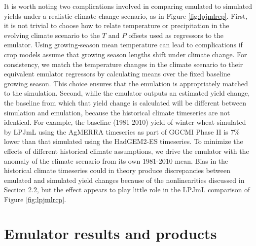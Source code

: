 \documentclass[gmdd]{copernicus} %
\begin{document}
It is worth noting two complications involved in comparing emulated to simulated yields under a realistic climate change scenario, as in Figure \ref{fig:lpjmlrcp}.
First, it is not trivial to choose how to relate temperature or precipitation in the evolving climate scenario to the $T$ and $P$ offsets used as regressors to the emulator. 
Using growing-season mean temperature can lead to complications if crop models assume that growing season lengths shift under climate change. 
For consistency, we match the temperature changes in the climate scenario to their equivalent emulator regressors by calculating means over the fixed baseline growing season. 
This choice ensures that the emulation is appropriately matched to the simulation.
Second, while the emulator outputs an estimated yield change, the baseline from which that yield change is calculated will be different between simulation and emulation, because the historical climate timeseries are not identical. For example, the baseline (1981-2010) yield of winter wheat simulated by LPJmL using the AgMERRA timeseries as part of GGCMI Phase II is 7\% lower than that simulated using the HadGEM2-ES timeseries. 
To minimize the effects of different historical climate assumptions, we drive the emulator with the anomaly of the climate scenario from its own 1981-2010 mean. 
Bias in the historical climate timeseries could in theory produce discrepancies between emulated and simulated yield changes because of the nonlinearities discussed in Section 2.2, but the effect appears to play little role in the LPJmL comparison of Figure \ref{fig:lpjmlrcp}. 

\section{Emulator results and products}
\label{S:5}
\end{document}
